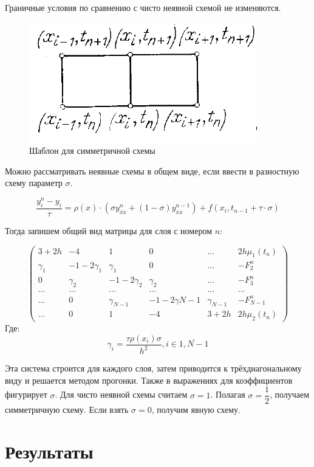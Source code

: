 \documentclass[12pt]{article}
\begin{document}
Граничные условия по сравнению с чисто неявной схемой не изменяются.

\begin{figure}[h]
\begin{center}
\includegraphics[scale = 0.8]{sym.png} 
\end{center}
\caption{Шаблон для симметричной схемы}
\end{figure}

Можно рассматривать неявные схемы в общем виде, если ввести в разностную схему параметр $\sigma$.

$$
\dfrac{y_i^{n} - y_i^{}}{\tau} = \rho(x) \cdot (\sigma y_{\overline{x}x}^n + (1-\sigma)y_{\overline{x}x}^{n-1}) + f(x_i, t_{n-1}+ \tau \cdot \sigma)
$$

Тогда запишем общий вид матрицы для слоя с номером $n$:

$$
\left(\begin{array}{ccccc|c}
	3+2h & -4 &  1 & 0 & ... & 2h\mu_1(t_n) \\
	\gamma_1 & -1-2\gamma_1 & \gamma_1 & 0 & ... & -F_2^n \\
	0 & \gamma_2 & -1-2\gamma_2 & \gamma_2 & ... & -F_3^n \\
	... & ... & ... & ... & ... &  ... \\
	... & 0 & \gamma_{N-1} & -1-2\gamma{N-1} & \gamma_{N-1} & -F_{N-1}^n \\
	... & 0 & 1 & -4 & 3+2h & 2h\mu_2(t_n) 
\end{array}\right)
$$
Где:
$$
\gamma_i = \dfrac{\tau \rho(x_i) \sigma}{h^2}, i \in \overline{1, N-1}
$$

Эта система строится для каждого слоя, затем приводится к трёхдиагональному виду и решается методом прогонки. 
Также в выражениях для коэффициентов фигурирует $\sigma$. Для чисто неявной схемы считаем $\sigma=1$. Полагая $\sigma=\dfrac{1}{2}$, получаем симметричную схему. Если взять $\sigma = 0$, получим явную схему.

\section{Результаты}
\end{document}
